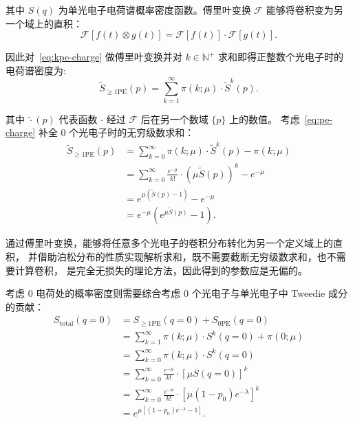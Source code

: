 其中 $S(q)$ 为单光电子电荷谱概率密度函数。傅里叶变换 $\mathcal{F}$ 能够将卷积变为另一个域上的直积：
\begin{equation}
    \mathcal{F}\left[f(t)\otimes g(t)\right]=\mathcal{F}[f(t)]\cdot\mathcal{F}[g(t)].
    \label{eq:fourier}
\end{equation}

因此对~\eqref{eq:kpe-charge} 做傅里叶变换并对 $k\in\mathbb{N}^{+}$ 求和即得正整数个光电子时的电荷谱密度为:
\begin{equation}
    \tilde{S}_{\ge1\text{PE}}(p)=\sum_{k=1}^{\infty}
    \pi(k;\mu)\cdot\tilde{S}^k(p).
    \label{eq:pe-charge}
\end{equation}

其中 $\tilde{\cdot}(p)$ 代表函数 $\cdot$ 经过 $\mathcal{F}$ 后在另一个数域 $\{p\}$ 上的数值。
考虑~\eqref{eq:pe-charge} 补全 0 个光电子时的无穷级数求和：
\begin{equation}
    \begin{aligned}
        \tilde{S}_{\ge1\text{PE}}(p)
        &=\sum_{k=0}^{\infty}\pi(k;\mu)\cdot\tilde{S}^k(p)-\pi(k;\mu)\\
        &=\sum_{k=0}^{\infty}\frac{e^{-\mu}}{k!}\cdot\left(\mu\tilde{S}(p)\right)^k-e^{-\mu}\\
        &=e^{\mu(\tilde{S}(p)-1)}-e^{-\mu}\\
        &=e^{-\mu}(e^{\mu\tilde{S}(p)}-1).
    \end{aligned}
    \label{eq:postive-charge}
\end{equation}

通过傅里叶变换，能够将任意多个光电子的卷积分布转化为另一个定义域上的直积，
并借助泊松分布的性质实现解析求和，既不需要截断无穷级数求和，也不需要计算卷积，
是完全无损失的理论方法，因此得到的参数应是无偏的。

考虑 0 电荷处的概率密度则需要综合考虑 0 个光电子与单光电子中 Tweedie 成分的贡献：
\begin{equation}
    \begin{aligned}
        S_{\text{total}}(q=0)
        &=S_{\ge1\text{PE}}(q=0)+S_{0\text{PE}}(q=0)\\
        &=\sum_{k=1}^{\infty}\pi(k;\mu)\cdot S^k(q=0)+\pi(0;\mu)\\
        &=\sum_{k=0}^{\infty}\pi(k;\mu)\cdot S^k(q=0)\\
        &=\sum_{k=0}^{\infty}\frac{e^{-\mu}}{k!}\cdot\left[\mu S(q=0)\right]^k\\
        &=\sum_{k=0}^{\infty}\frac{e^{-\mu}}{k!}\cdot\left[\mu(1-p_0)e^{-\lambda}\right]^k\\
        &=e^{\mu\left[(1-p_0)e^{-\lambda}-1\right]}.
    \end{aligned}
    \label{eq:zero-charge}
\end{equation}

